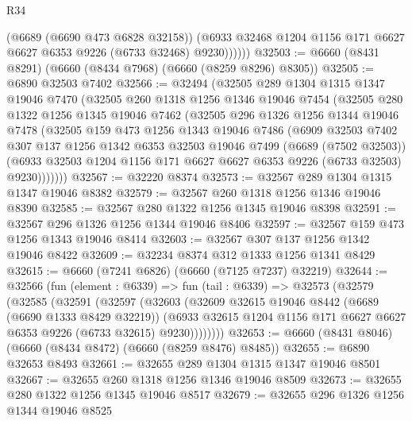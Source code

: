 \begin{lexlean}{R34}
\begin{coremodule}
              (@6689 (@6690 @473 @6828 @32158))
              (@6933 @32468 @1204 @1156 @171 @6627 @6627 @6353 @9226 (@6733 @32468) @9230))))))
@32503 := @6660 (@8431 @8291) (@6660 (@8434 @7968) (@6660 (@8259 @8296) @8305))
@32505 := @6890 @32503 @7402
@32566 := @32494
    (@32505
      @289
      @1304
      @1315
      @1347
      @19046
      @7470
      (@32505
        @260
        @1318
        @1256
        @1346
        @19046
        @7454
        (@32505
          @280
          @1322
          @1256
          @1345
          @19046
          @7462
          (@32505
            @296
            @1326
            @1256
            @1344
            @19046
            @7478
            (@32505
              @159
              @473
              @1256
              @1343
              @19046
              @7486
              (@6909
                @32503
                @7402
                @307
                @137
                @1256
                @1342
                @6353
                @32503
                @19046
                @7499
                (@6689 (@7502 @32503))
                (@6933 @32503 @1204 @1156 @171 @6627 @6627 @6353 @9226 (@6733 @32503) @9230)))))))
@32567 := @32220 @8374
@32573 := @32567 @289 @1304 @1315 @1347 @19046 @8382
@32579 := @32567 @260 @1318 @1256 @1346 @19046 @8390
@32585 := @32567 @280 @1322 @1256 @1345 @19046 @8398
@32591 := @32567 @296 @1326 @1256 @1344 @19046 @8406
@32597 := @32567 @159 @473 @1256 @1343 @19046 @8414
@32603 := @32567 @307 @137 @1256 @1342 @19046 @8422
@32609 := @32234 @8374 @312 @1333 @1256 @1341 @8429
@32615 := @6660 (@7241 @6826) (@6660 (@7125 @7237) @32219)
@32644 := @32566
    (fun (element : @6339) =>
    fun (tail : @6339) =>
    @32573
      (@32579
        (@32585
          (@32591
            (@32597
              (@32603
                (@32609
                  @32615
                  @19046
                  @8442
                  (@6689 (@6690 @1333 @8429 @32219))
                  (@6933
                    @32615
                    @1204
                    @1156
                    @171
                    @6627
                    @6627
                    @6353
                    @9226
                    (@6733 @32615)
                    @9230))))))))
@32653 := @6660 (@8431 @8046) (@6660 (@8434 @8472) (@6660 (@8259 @8476) @8485))
@32655 := @6890 @32653 @8493
@32661 := @32655 @289 @1304 @1315 @1347 @19046 @8501
@32667 := @32655 @260 @1318 @1256 @1346 @19046 @8509
@32673 := @32655 @280 @1322 @1256 @1345 @19046 @8517
@32679 := @32655 @296 @1326 @1256 @1344 @19046 @8525

\end{coremodule}
\end{lexlean}
